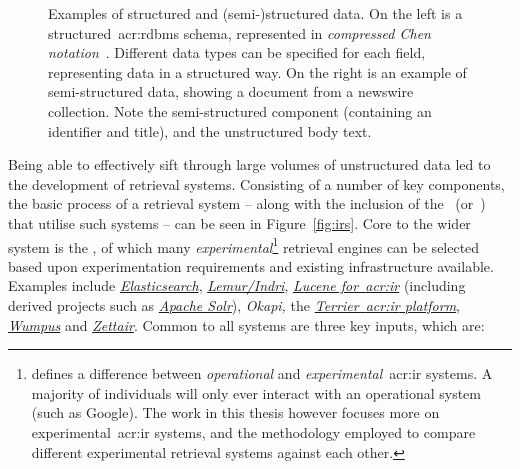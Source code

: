 \begin{figure}[t!]
    \centering
    \caption[Structured and (semi-)structured data]{Examples of structured and (semi-)structured data. On the left is a structured~\gls{acr:rdbms} schema, represented in \emph{compressed Chen notation}~\citep{chen1976notation}. Different data types can be specified for each field, representing data in a structured way. On the right is an example of semi-structured data, showing a document from a newswire collection. Note the semi-structured component (containing an identifier and title), and the unstructured body text.}
    \label{fig:structured_data}
\end{figure}

Being able to effectively sift through large volumes of unstructured data led to the development of retrieval systems. Consisting of a number of key components, the basic process of a retrieval system -- along with the inclusion of the~ (or~) that utilise such systems -- can be seen in Figure~\ref{fig:irs}. Core to the wider system is the , of which many \emph{experimental}\footnote{\cite{rijsbergen1979ir} defines a difference between \emph{operational} and \emph{experimental}~\gls{acr:ir} systems. A majority of individuals will only ever interact with an operational system (such as Google). The work in this thesis however focuses more on experimental~\gls{acr:ir} systems, and the methodology employed to compare different experimental retrieval systems against each other.} retrieval engines can be selected based upon experimentation requirements and existing infrastructure available. Examples include \href{https://www.elastic.co/}{\emph{Elasticsearch}}, \href{https://www.lemurproject.org/}{\emph{Lemur/Indri}}, \emph{\href{http://lucene.apache.org/}{Lucene for~\gls{acr:ir}}} (including derived projects such as \href{http://lucene.apache.org/solr/}{\emph{Apache Solr}}), \emph{Okapi,} the \href{http://terrier.org/}{\emph{Terrier~\gls{acr:ir} platform}}, \href{https://github.com/gmargari/wumpus}{\emph{Wumpus}} and \href{http://www.seg.rmit.edu.au/zettair/}{\emph{Zettair}}. Common to all systems are three key inputs, which are:

